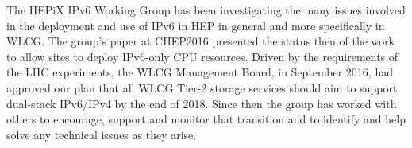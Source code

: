 
The HEPiX IPv6 Working Group \cite{ipv6wg} has been investigating the many issues involved in the deployment and use of
IPv6 in HEP in general and more specifically in WLCG. The group's paper at CHEP2016 \cite{ipv6chep2016}
presented the status then of the work to allow sites to deploy IPv6-only CPU resources. Driven by the
requirements of the LHC experiments, the WLCG Management Board, in September 2016, had approved our plan
that all WLCG Tier-2 storage services should aim to support dual-stack IPv6/IPv4 by the end of 2018. Since then the
group has worked with others to encourage, support and monitor that transition and to identify and help
solve any technical issues as they arise.


 
